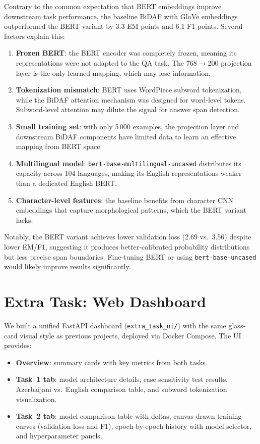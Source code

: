 \documentclass[10pt,a4paper]{article}
\begin{document}
Contrary to the common expectation that BERT embeddings improve downstream task performance, the baseline BiDAF with GloVe embeddings outperformed the BERT variant by 3.3 EM points and 6.1 F1 points. Several factors explain this:

\begin{enumerate}
    \item \textbf{Frozen BERT}: the BERT encoder was completely frozen, meaning its representations were not adapted to the QA task. The 768$\to$200 projection layer is the only learned mapping, which may lose information.
    \item \textbf{Tokenization mismatch}: BERT uses WordPiece subword tokenization, while the BiDAF attention mechanism was designed for word-level tokens. Subword-level attention may dilute the signal for answer span detection.
    \item \textbf{Small training set}: with only 5\,000 examples, the projection layer and downstream BiDAF components have limited data to learn an effective mapping from BERT space.
    \item \textbf{Multilingual model}: \texttt{bert-base-multilingual-uncased} distributes its capacity across 104 languages, making its English representations weaker than a dedicated English BERT.
    \item \textbf{Character-level features}: the baseline benefits from character CNN embeddings that capture morphological patterns, which the BERT variant lacks.
\end{enumerate}

Notably, the BERT variant achieves lower validation loss (2.69 vs.\ 3.56) despite lower EM/F1, suggesting it produces better-calibrated probability distributions but less precise span boundaries. Fine-tuning BERT or using \texttt{bert-base-uncased} would likely improve results significantly.

\section{Extra Task: Web Dashboard}

We built a unified FastAPI dashboard (\texttt{extra\_task\_ui/}) with the same glass-card visual style as previous projects, deployed via Docker Compose. The UI provides:

\begin{itemize}
    \item \textbf{Overview}: summary cards with key metrics from both tasks.
    \item \textbf{Task~1 tab}: model architecture details, case sensitivity test results, Azerbaijani vs.\ English comparison table, and subword tokenization visualization.
    \item \textbf{Task~2 tab}: model comparison table with deltas, canvas-drawn training curves (validation loss and F1), epoch-by-epoch history with model selector, and hyperparameter panels.
\end{itemize}
\end{document}
